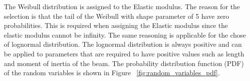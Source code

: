 \documentclass[paper=a4, fontsize=12pt]{scrartcl} %
\begin{document}
%
The Weibull distribution is assigned to the Elastic modulus. The reason for the selection is that the tail of the Weibull with shape parameter of 5 have zero probabilities. This is required when assigning the Elastic modulus since the elastic modulus cannot be infinity. The same reasoning is applicable for the chose of lognormal distribution. The lognormal distribution is always positive and can be applied to parameters that are required to have positive values such as length and moment of inertia of the beam. The probability distribution function (PDF) of the random variables is shown in Figure ~\ref{fig:random_variables_pdf}.
%
	\begin{figure}[H]
		\centering
		\quad
		\\
\end{figure}
\end{document}
